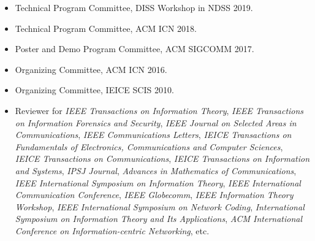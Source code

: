 \begin{itemize}
 \item Technical Program Committee, DISS Workshop in NDSS 2019.
 \item Technical Program Committee, ACM ICN 2018.
 \item Poster and Demo Program Committee, ACM SIGCOMM 2017.
 \item Organizing Committee, ACM ICN 2016.
 \item Organizing Committee, IEICE SCIS 2010.
 \item Reviewer for
\textit{IEEE Transactions on Information Theory},
\textit{IEEE Transactions on Information Forensics and Security},
\textit{IEEE Journal on Selected Areas in Communications},
\textit{IEEE Communications Letters},
\textit{IEICE Transactions on Fundamentals of Electronics, Communications and Computer Sciences},
\textit{IEICE Transactions on Communications},
\textit{IEICE Transactions on Information and Systems},
\textit{IPSJ Journal},
\textit{Advances in Mathematics of Communications},
\textit{IEEE International Symposium on Information Theory},
\textit{IEEE International Communication Conference},
\textit{IEEE Globecomm},
\textit{IEEE Information Theory Workshop},
\textit{IEEE International Symposium on Network Coding},
\textit{International Symposium on Information Theory and Its Applications},
\textit{ACM International Conference on Information-centric Networking},
%
etc.
\end{itemize}
